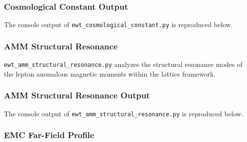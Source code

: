 \documentclass[10pt,a4paper]{article}
\begin{document}


\subsubsection{Cosmological Constant Output}
\label{app:ewt_cosmological_constant_output}

The console output of \texttt{ewt\_cosmological\_constant.py} is
reproduced below.



\subsubsection{AMM Structural Resonance}
\label{app:ewt_amm_structural_resonance}

\texttt{ewt\_amm\_structural\_resonance.py} analyzes the structural resonance modes of the lepton anomalous magnetic moments within the lattice framework.



\subsubsection{AMM Structural Resonance Output}
\label{app:ewt_amm_structural_resonance_output}

The console output of \texttt{ewt\_amm\_structural\_resonance.py} is reproduced below.



\subsubsection{EMC Far-Field Profile}
\label{app:ewt_emc_far_field_profile}
\end{document}
